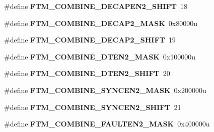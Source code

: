 \begin{DoxyCompactItemize}
\item 
\#define {\bfseries F\+T\+M\+\_\+\+C\+O\+M\+B\+I\+N\+E\+\_\+\+D\+E\+C\+A\+P\+E\+N2\+\_\+\+S\+H\+I\+FT}~18\hypertarget{group__FTM__Register__Masks_ga63c12c9b713d5078d861e14c2d34aea6}{}\label{group__FTM__Register__Masks_ga63c12c9b713d5078d861e14c2d34aea6}

\item 
\#define {\bfseries F\+T\+M\+\_\+\+C\+O\+M\+B\+I\+N\+E\+\_\+\+D\+E\+C\+A\+P2\+\_\+\+M\+A\+SK}~0x80000u\hypertarget{group__FTM__Register__Masks_ga94d0092dd5448a53c187d23ab9f7c52a}{}\label{group__FTM__Register__Masks_ga94d0092dd5448a53c187d23ab9f7c52a}

\item 
\#define {\bfseries F\+T\+M\+\_\+\+C\+O\+M\+B\+I\+N\+E\+\_\+\+D\+E\+C\+A\+P2\+\_\+\+S\+H\+I\+FT}~19\hypertarget{group__FTM__Register__Masks_ga79322ba97c65c632a32e7cf7790286f9}{}\label{group__FTM__Register__Masks_ga79322ba97c65c632a32e7cf7790286f9}

\item 
\#define {\bfseries F\+T\+M\+\_\+\+C\+O\+M\+B\+I\+N\+E\+\_\+\+D\+T\+E\+N2\+\_\+\+M\+A\+SK}~0x100000u\hypertarget{group__FTM__Register__Masks_gadd286edd7ecc4625be042f1583ea8a74}{}\label{group__FTM__Register__Masks_gadd286edd7ecc4625be042f1583ea8a74}

\item 
\#define {\bfseries F\+T\+M\+\_\+\+C\+O\+M\+B\+I\+N\+E\+\_\+\+D\+T\+E\+N2\+\_\+\+S\+H\+I\+FT}~20\hypertarget{group__FTM__Register__Masks_ga46657f8744aea437178eb9de3a25b0ff}{}\label{group__FTM__Register__Masks_ga46657f8744aea437178eb9de3a25b0ff}

\item 
\#define {\bfseries F\+T\+M\+\_\+\+C\+O\+M\+B\+I\+N\+E\+\_\+\+S\+Y\+N\+C\+E\+N2\+\_\+\+M\+A\+SK}~0x200000u\hypertarget{group__FTM__Register__Masks_ga9b171aec492022bb55593f6bfae038da}{}\label{group__FTM__Register__Masks_ga9b171aec492022bb55593f6bfae038da}

\item 
\#define {\bfseries F\+T\+M\+\_\+\+C\+O\+M\+B\+I\+N\+E\+\_\+\+S\+Y\+N\+C\+E\+N2\+\_\+\+S\+H\+I\+FT}~21\hypertarget{group__FTM__Register__Masks_ga64914009d95ebee18e191655129c2c07}{}\label{group__FTM__Register__Masks_ga64914009d95ebee18e191655129c2c07}

\item 
\#define {\bfseries F\+T\+M\+\_\+\+C\+O\+M\+B\+I\+N\+E\+\_\+\+F\+A\+U\+L\+T\+E\+N2\+\_\+\+M\+A\+SK}~0x400000u\hypertarget{group__FTM__Register__Masks_gad67706e653caa0da6a85514ebd5d2fc7}{}\label{group__FTM__Register__Masks_gad67706e653caa0da6a85514ebd5d2fc7}


\end{DoxyCompactItemize}

